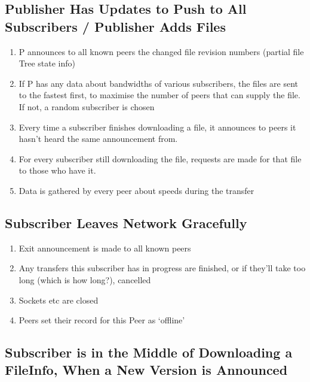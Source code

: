 \documentclass[12pt,a4paper,]{adreport}
\begin{document}
\subsection{Publisher Has Updates to Push to All Subscribers / Publisher
Adds
Files}\label{publisher-has-updates-to-push-to-all-subscribers-publisher-adds-files}

\begin{enumerate}
\def\labelenumi{\arabic{enumi}.}
\itemsep1pt\parskip0pt
\item
  P announces to all known peers the changed file revision numbers
  (partial file Tree state info)
\item
  If P has any data about bandwidths of various subscribers, the files
  are sent to the fastest first, to maximise the number of peers that
  can supply the file. If not, a random subscriber is chosen
\item
  Every time a subscriber finishes downloading a file, it announces to
  peers it hasn't heard the same announcement from.
\item
  For every subscriber still downloading the file, requests are made for
  that file to those who have it.
\item
  Data is gathered by every peer about speeds during the transfer
\end{enumerate}

\subsection{Subscriber Leaves Network
Gracefully}\label{subscriber-leaves-network-gracefully}

\begin{enumerate}
\def\labelenumi{\arabic{enumi}.}
\itemsep1pt\parskip0pt
\item
  Exit announcement is made to all known peers
\item
  Any transfers this subscriber has in progress are finished, or if
  they'll take too long (which is how long?), cancelled
\item
  Sockets etc are closed
\item
  Peers set their record for this Peer as `offline'
\end{enumerate}

\subsection{Subscriber is in the Middle of Downloading a FileInfo, When
a New Version is
Announced}\label{subscriber-is-in-the-middle-of-downloading-a-fileinfo-when-a-new-version-is-announced}
\end{document}
